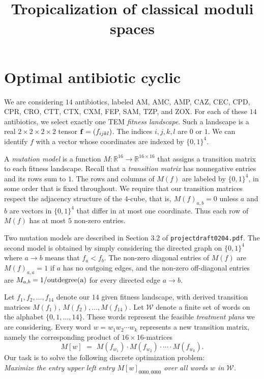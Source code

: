 \documentclass[12pt]{article}
\numberwithin{equation}{section}
\theoremstyle{plain}%
\numberwithin{theorem}{section}
\newcommand{\R}{\mathbb{R}}
\begin{document}
\title{\bf Tropicalization of classical moduli spaces}

\section{Optimal antibiotic cyclic}

We are considering $14$ antibiotics, labeled
AM, AMC, AMP, CAZ, CEC, CPD, CPR, CRO, CTT, CTX, CXM, FEP, SAM, TZP,
and ZOX. For each of these $14$ antibiotics, we select exactly one TEM 
{\em fitness landscape}.
Such a landscape  is a real $2 {\times} 2 {\times} 2 {\times} 2$ tensor 
${\bf f} = (f_{ijkl})$. The indices $i,j,k,l$ are $0$ or $1$.
We can identify $f$ with a vector whose coordinates
are indexed by $\{0,1\}^4$.

A {\em mutation model} is a function $M : \R^{16} \rightarrow \R^{16 \times 16}$
that assigns a transition matrix to each fitness landscape.
Recall that a {\em transition matrix} has nonnegative entries
and its rows sum to $1$. The rows and columns of
$M(f)$ are labeled by $\{0,1\}^4$, in some order
that is fixed throughout.
We require that our transition matrices respect the adjacency structure
of the $4$-cube, that is, $M(f)_{a,b} = 0$
unless $a$ and $b$ are vectors in $\{0,1\}^4$ that differ in at most one coordinate.
Thus each row of $M(f)$ has at most $5$ non-zero entries.

Two mutation models are described in Section 3.2 of {\tt projectdraft0204.pdf}.
The second model is obtained by simply considering the
directed graph on $\{0,1\}^4$ where $a \rightarrow b$ means
that $f_a < f_b$. The non-zero diagonal entries of $M(f)$ are
  $M(f)_{a,a} = 1$ if $a$ has no outgoing edges, 
  and the non-zero off-diagonal entries are
$M_{a,b} = 1/\hbox{outdegree(a)}$ for every directed edge $a \rightarrow b$.

Let $f_1,f_2,\ldots,f_{14}$ denote our $14$ given fitness landscape,
with derived transition matrices
 $M(f_1)$, $M(f_2),\ldots, M(f_{14})$.
 Let $\mathcal{W}$ denote a finite set of
 words on the alphabet $\{0,1,\ldots,14\}$.
 These words represent the feasible {\em treatment plans} we are considering.
 Every word $w = w_1 w_2 \cdots w_k$ represents a new transition matrix,
 namely the corresponding
  product of $16 {\times} 16$-matrices
 $$ M[w] \,\, = \,\, M(f_{w_1}) \cdot M(f_{w_2}) \cdot \cdots \cdot M(f_{w_k}).$$
Our task is to solve the following discrete optimization problem: \\
{\em
Maximize the entry upper left entry $M[w]_{0000,0000}$
over all words $w$ in $\mathcal{W}$. }
\end{document}
